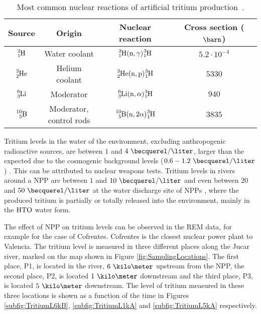 \begin{table}[htbp]
\begin{center}
\begin{tabular}{|c|c|c|c|}
\hline
Source & Origin & Nuclear reaction & Cross section ($\barn$)\\
\hline \hline \hline
$\ce{^{2}_{1}H}$ & Water coolant & $\ce{^{2}_{1}H}(\ce{n},\gamma)\ce{^{3}_{1}H}$ & $5.2 \cdot{} 10^{-4}$ \\ \hline
$\ce{^{3}_{2}He}$ & Helium coolant & $\ce{^{3}_{2}He}(\ce{n},\ce{p})\ce{^{3}_{1}H}$ & $5330$ \\ \hline
$\ce{^{6}_{3}Li}$ & Moderator & $\ce{^{6}_{3}Li}(\ce{n},\alpha)\ce{^{3}_{1}H}$ & $940$ \\ \hline
$\ce{^{10}_{5}B}$ & \parbox{8em}{\centering Moderator,\\ control rods} & $\ce{^{10}_{5}B}(\ce{n},2\alpha)\ce{^{3}_{1}H}$ & $3835$ \\ 
\hline
\end{tabular}
\caption{Most common nuclear reactions of artificial tritium production~\cite{CommonEmissionTritium}.}
\label{tab:NuclearReactionsTritiumProduction}
\end{center}
\end{table}

Tritium levels in the water of the environment, excluding anthropogenic radioactive sources, are between $1$ and $4~\becquerel/\liter$, larger than the expected due to the cosmogenic background levels ($0.6-1.2~\becquerel/\liter$) \cite{FranceTritiumEnvironment}. This can be attributed to nuclear weapons tests. Tritium levels in rivers around a NPP are between $1$ and $10~\becquerel/\liter$ and even between $20$ and $50~\becquerel/\liter$ at the water discharge site of NPPs \cite{FranceTritiumEnvironment}, where the produced tritium is partially or totally released into the environment, mainly in the $\ce{HTO}$ water form.

The effect of NPP on tritium levels can be observed in the REM data, for example for the case of Cofrentes. Cofrentes is the closest nuclear power plant to Valencia. The tritium level is measured in three different places along the Jucar river, marked on the map shown in Figure \ref{fig:SamplingLocations}. The first place, P1, is located in the river, $6~\kilo\meter$ upstream from the NPP, the second place, P2, is located $1~\kilo\meter$ downstream and the third place, P3, is located $5~\kilo\meter$ downstream. The level of tritium measured in these three locations is shown as a function of the time in Figures \ref{subfig:TritiumL6kB}, \ref{subfig:TritiumL1kA} and \ref{subfig:TritiumL5kA} respectively.

